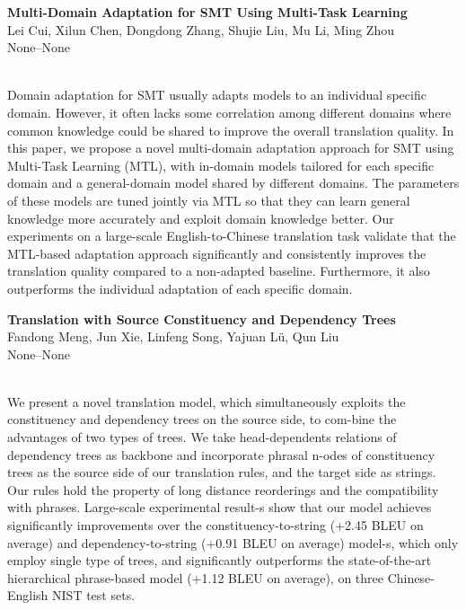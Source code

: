 \documentclass[twoside,makeidx]{book}
\begin{document}
\par\vspace{2em}\noindent%
\begin{minipage}{\linewidth}%
\begin{center}
\textbf{\normalsize Multi-Domain Adaptation for SMT Using Multi-Task Learning}\\
\normalsize  Lei Cui,  Xilun Chen,  Dongdong Zhang,  Shujie Liu,  Mu Li,  Ming Zhou\\
{\small None--None}\\
\end{center}
\end{minipage}\\[0.5em]
\nopagebreak%
\noindent%
{\small Domain adaptation for SMT usually adapts models to an individual specific domain. However, it often lacks some correlation among different domains where common knowledge could be shared to improve the overall translation quality. In this paper, we propose a novel multi-domain adaptation approach for SMT using Multi-Task Learning (MTL), with in-domain models tailored for each specific domain and a general-domain model shared by different domains. The parameters of these models are tuned jointly via MTL so that they can learn general knowledge more accurately and exploit domain knowledge better. Our experiments on a large-scale English-to-Chinese translation task validate that the MTL-based adaptation approach significantly and consistently improves the translation quality compared to a non-adapted baseline. Furthermore, it also outperforms the individual adaptation of each specific domain.}
\par\vspace{2em}\noindent%
\begin{minipage}{\linewidth}%
\begin{center}
\textbf{\normalsize Translation with Source Constituency and Dependency Trees}\\
\normalsize  Fandong Meng,  Jun Xie,  Linfeng Song,  Yajuan L\"{u},  Qun Liu\\
{\small None--None}\\
\end{center}
\end{minipage}\\[0.5em]
\nopagebreak%
\noindent%
{\small We present a novel translation model, which simultaneously exploits the constituency and dependency trees on the source side, to com-bine the advantages of two types of trees. We take head-dependents relations of dependency trees as backbone and incorporate phrasal n-odes of constituency trees as the source side of our translation rules, and the target side as strings. Our rules hold the property of long distance reorderings and the compatibility with phrases. Large-scale experimental result-s show that our model achieves significantly improvements over the constituency-to-string (+2.45 BLEU on average) and dependency-to-string (+0.91 BLEU on average) model-s, which only employ single type of trees, and significantly outperforms the state-of-the-art hierarchical phrase-based model (+1.12 BLEU on average), on three Chinese-English NIST test sets.}
\end{document}

